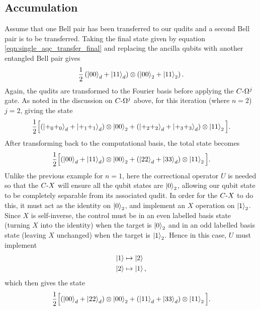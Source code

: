 \subsection{Accumulation}
\label{subsection:accumulation}
Assume that one Bell pair has been transferred to our qudits and a second Bell pair is to be transferred.
Taking the final state given by equation \ref{eqn:single_aqc_transfer_final} and replacing the ancilla qubits with another entangled Bell pair gives
\begin{equation}
    \frac{1}{2}\left(
            \ket{00}_d +\ket{11}_d
        \right)
        \otimes 
        \left(
            \ket{00}_2 +\ket{11}_2
        \right).
\end{equation}
Again, the qudits are transformed to the Fourier basis before applying the $C\text{-}\Omega^j$ gate.
As noted in the discussion on $C\text{-}\Omega^j$ above, for this iteration (where $n=2$) $j=2$, giving the state
\begin{equation}
    \frac{1}{2}\Big[
            (\ket{+_0 +_0}_d + \ket{+_1 +_1}_d)\otimes\ket{00}_2
            +(\ket{+_2 +_2}_d + \ket{+_3 +_3}_d)\otimes\ket{11}_2
        \Big].
\end{equation}
After transforming back to the computational basis, the total state becomes
\begin{equation}
    \frac{1}{2}\Big[
            (\ket{00}_d + \ket{11}_d)\otimes\ket{00}_2
            +(\ket{22}_d + \ket{33}_d)\otimes\ket{11}_2
        \Big].
\end{equation}
Unlike the previous example for $n=1$, here the correctional operator $U$ is needed so that the $C\text{-}X$ will ensure all the qubit states are $\ket{0}_2$, allowing our qubit state to be completely separable from its associated qudit.
In order for the $C\text{-}X$ to do this, it must act as the identity on $\ket{0}_2$, and implement an $X$ operation on $\ket{1}_2$.
Since $X$ is self-inverse, the control must be in an even labelled basis state (turning $X$ into the identity) when the target is $\ket{0}_2$ and in an odd labelled basis state (leaving $X$ unchanged) when the target is $\ket{1}_2$.
Hence in this case, $U$ must implement
\begin{align}
    \ket{1} &\mapsto \ket{2}\\
    \ket{2} &\mapsto \ket{1},
\end{align}
which then gives the state
\begin{equation}
    \frac{1}{2}\Big[
            (\ket{00}_d + \ket{22}_d)\otimes\ket{00}_2
            +(\ket{11}_d + \ket{33}_d)\otimes\ket{11}_2
        \Big].
\end{equation}
